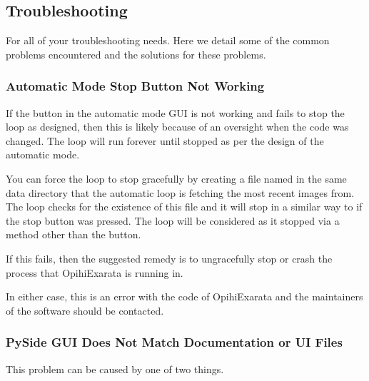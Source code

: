 \documentclass[letterpaper,11pt,english]{sphinxmanual}
\begin{document}
\sphinxstepscope


\subsection{Troubleshooting}
\label{\detokenize{user/troubleshooting:troubleshooting}}\label{\detokenize{user/troubleshooting:user-troubleshooting}}\label{\detokenize{user/troubleshooting::doc}}
\sphinxAtStartPar
For all of your troubleshooting needs. Here we detail some of the common
problems encountered and the solutions for these problems.


\subsubsection{Automatic Mode Stop Button Not Working}
\label{\detokenize{user/troubleshooting:automatic-mode-stop-button-not-working}}\label{\detokenize{user/troubleshooting:user-troubleshooting-automatic-mode-stop-button-not-working}}
\sphinxAtStartPar
If the  button in the automatic mode GUI is not working and
fails to stop the loop as designed, then this is likely because of an oversight
when the code was changed. The loop will run forever until stopped as per the
design of the automatic mode.

\sphinxAtStartPar
You can force the loop to stop gracefully by creating a file named
 in the same data directory that the
automatic loop is fetching the most recent images from. The loop checks for the
existence of this file and it will stop in a similar way to if the stop button
was pressed. The loop will be considered  as it stopped via
a method other than the  button.

\sphinxAtStartPar
If this fails, then the suggested remedy is to ungracefully stop or crash the
process that OpihiExarata is running in.

\sphinxAtStartPar
In either case, this is an error with the code of OpihiExarata and the
maintainers of the software should be contacted.


\subsubsection{PySide GUI Does Not Match Documentation or UI Files}
\label{\detokenize{user/troubleshooting:pyside-gui-does-not-match-documentation-or-ui-files}}\label{\detokenize{user/troubleshooting:user-troubleshooting-pyside-gui-does-not-match-documentation-or-ui-files}}
\sphinxAtStartPar
This problem can be caused by one of two things.
\end{document}
